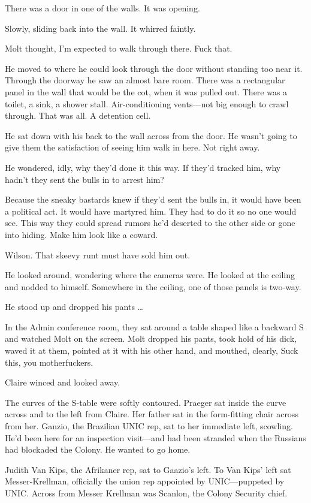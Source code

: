 There was a door in one of the walls. It was opening.

Slowly, sliding back into the wall. It whirred faintly.

Molt thought, I’m expected to walk through there. Fuck that.

He moved to where he could look through the door without standing too near it. Through the doorway he saw an almost bare room. There was a rectangular panel in the wall that would be the cot, when it was pulled out. There was a toilet, a sink, a shower stall. Air-conditioning vents—not big enough to crawl through. That was all. A detention cell.

He sat down with his back to the wall across from the door. He wasn’t going to give them the satisfaction of seeing him walk in here. Not right away.

He wondered, idly, why they’d done it this way. If they’d tracked him, why hadn’t they sent the bulls in to arrest him?

Because the sneaky bastards knew if they’d sent the bulls in, it would have been a political act. It would have martyred him. They had to do it so no one would see. This way they could spread rumors he’d deserted to the other side or gone into hiding. Make him look like a coward.

Wilson. That skeevy runt must have sold him out.

He looked around, wondering where the cameras were. He looked at the ceiling and nodded to himself. Somewhere in the ceiling, one of those panels is two-way.

He stood up and dropped his pants …

In the Admin conference room, they sat around a table shaped like a backward S and watched Molt on the screen. Molt dropped his pants, took hold of his dick, waved it at them, pointed at it with his other hand, and mouthed, clearly, Suck this, you motherfuckers.

Claire winced and looked away.

The curves of the S-table were softly contoured. Praeger sat inside the curve across and to the left from Claire. Her father sat in the form-fitting chair across from her. Ganzio, the Brazilian UNIC rep, sat to her immediate left, scowling. He’d been here for an inspection visit—and had been stranded when the Russians had blockaded the Colony. He wanted to go home.

Judith Van Kips, the Afrikaner rep, sat to Gaazio’s left. To Van Kips’ left sat Messer-Krellman, officially the union rep appointed by UNIC—puppeted by UNIC. Across from Messer Krellman was Scanlon, the Colony Security chief.

